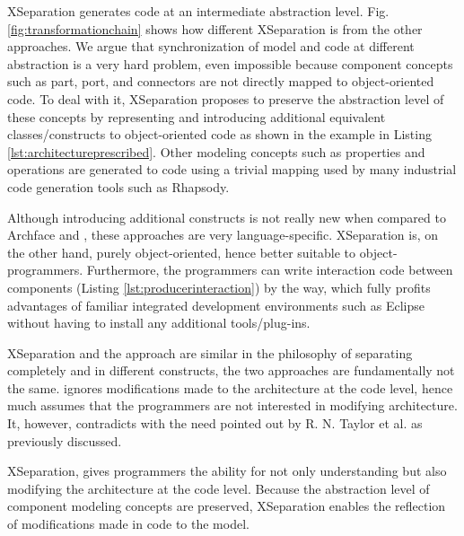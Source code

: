 XSeparation generates code at an intermediate abstraction level. 
Fig. \ref{fig:transformationchain} shows how different XSeparation is from the other approaches.
We argue that synchronization of model and code at different abstraction is a very hard problem, even impossible because component concepts such as part, port, and connectors are not directly mapped to object-oriented code. 
To deal with it, XSeparation proposes to preserve the abstraction level of these concepts by representing and introducing additional equivalent classes/constructs to object-oriented code as shown in the example in Listing \ref{lst:architectureprescribed}.
Other modeling concepts such as properties and operations are generated to code using a trivial mapping used by many industrial code generation tools such as Rhapsody.

Although introducing additional constructs is not really new when compared to Archface \cite{ubayashi2010archface} and \cite{aldrich2002archjava}, these approaches are very language-specific.
XSeparation is, on the other hand, purely object-oriented, hence better suitable to object-programmers. 
Furthermore, the programmers can write interaction code between components (Listing \ref{lst:producerinteraction}) by the way, which fully profits advantages of familiar integrated development environments such as Eclipse without having to install any additional tools/plug-ins.  

XSeparation and the  approach are similar in the philosophy of separating completely  and  in different constructs, the two approaches are fundamentally not the same. 
 ignores modifications made to the architecture at the code level, hence much assumes that the programmers are not interested in modifying architecture.
It, however, contradicts with the need pointed out by R. N. Taylor et al. \cite{Taylor:2007:SDA:1253532.1254721} as previously discussed. 

XSeparation, 
gives programmers the ability for not only understanding but also modifying the architecture at the code level.
Because the abstraction level of component modeling concepts are preserved, XSeparation enables the reflection of modifications made in code to the model.

